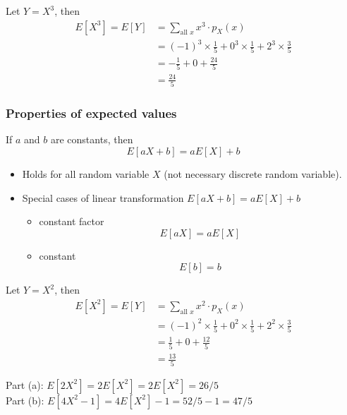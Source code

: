 \documentclass[slidestop,compress,mathserif]{beamer}
\begin{document}
\begin{frame}

\pause
Let $Y = X^3$, then
\begin{align*}
E[X^3] = E[Y] & = \sum_{\text{all }x} x^3 \cdot p_X(x)\\
& = (-1)^3 \times \frac{1}{5} + 0^3 \times \frac{1}{5} + 2^3 \times \frac{3}{5}\\
& = -\frac{1}{5} + 0 + \frac{24}{5} \\
& = \frac{24}{5}
\end{align*}


\end{frame}


\begin{frame}
\frametitle{Properties of expected values}

If $a$ and $b$ are constants, then
\[ E[aX+b] = a E[X] + b \]


\begin{itemize}
\item Holds for all random variable $X$ (not necessary discrete random variable).
\item Special cases of linear transformation $ E[aX+b] = a E[X] + b $
\begin{itemize}
\item constant factor \[ E[aX] = a E[X] \]

\item constant \[ E[b] = b \]
\end{itemize}
\end{itemize}

\end{frame}

\begin{frame}

\pause
Let $Y = X^2$, then
\begin{align*}
E[X^2] = E[Y] & = \sum_{\text{all }x} x^2 \cdot p_X(x)\\
& = (-1)^2 \times \frac{1}{5} + 0^2 \times \frac{1}{5} + 2^2 \times \frac{3}{5}\\
& = \frac{1}{5} + 0 + \frac{12}{5} \\
& = \frac{13}{5} 
\end{align*}

Part (a): $E[2X^2] = 2 E[X^2] = 2 E[X^2] = 26 / 5$\\
Part (b): $E[4X^2 - 1] = 4 E[X^2] - 1 = 52 / 5 - 1 =  47 / 5$
\end{frame}
\end{document}
